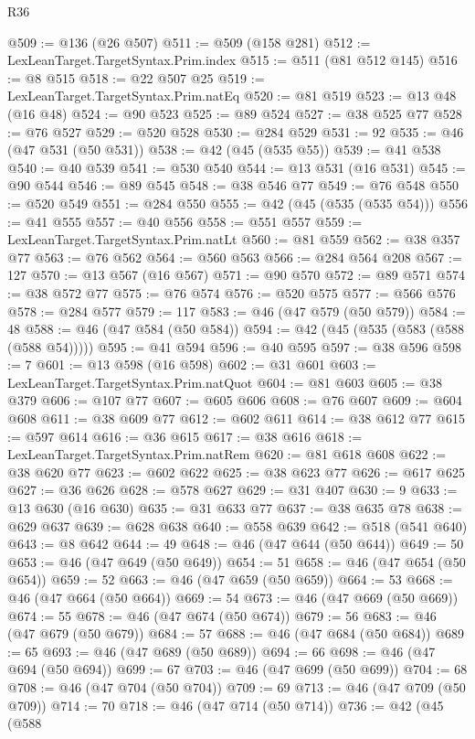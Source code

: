 \begin{lexlean}{R36}
\begin{coremodule}
@509 := @136 (@26 @507)
@511 := @509 (@158 @281)
@512 := LexLeanTarget.TargetSyntax.Prim.index
@515 := @511 (@81 @512 @145)
@516 := @8 @515
@518 := @22 @507 @25
@519 := LexLeanTarget.TargetSyntax.Prim.natEq
@520 := @81 @519
@523 := @13 @48 (@16 @48)
@524 := @90 @523
@525 := @89 @524
@527 := @38 @525 @77
@528 := @76 @527
@529 := @520 @528
@530 := @284 @529
@531 := 92
@535 := @46 (@47 @531 (@50 @531))
@538 := @42 (@45 (@535 @55))
@539 := @41 @538
@540 := @40 @539
@541 := @530 @540
@544 := @13 @531 (@16 @531)
@545 := @90 @544
@546 := @89 @545
@548 := @38 @546 @77
@549 := @76 @548
@550 := @520 @549
@551 := @284 @550
@555 := @42 (@45 (@535 (@535 @54)))
@556 := @41 @555
@557 := @40 @556
@558 := @551 @557
@559 := LexLeanTarget.TargetSyntax.Prim.natLt
@560 := @81 @559
@562 := @38 @357 @77
@563 := @76 @562
@564 := @560 @563
@566 := @284 @564 @208
@567 := 127
@570 := @13 @567 (@16 @567)
@571 := @90 @570
@572 := @89 @571
@574 := @38 @572 @77
@575 := @76 @574
@576 := @520 @575
@577 := @566 @576
@578 := @284 @577
@579 := 117
@583 := @46 (@47 @579 (@50 @579))
@584 := 48
@588 := @46 (@47 @584 (@50 @584))
@594 := @42 (@45 (@535 (@583 (@588 (@588 @54)))))
@595 := @41 @594
@596 := @40 @595
@597 := @38 @596
@598 := 7
@601 := @13 @598 (@16 @598)
@602 := @31 @601
@603 := LexLeanTarget.TargetSyntax.Prim.natQuot
@604 := @81 @603
@605 := @38 @379
@606 := @107 @77
@607 := @605 @606
@608 := @76 @607
@609 := @604 @608
@611 := @38 @609 @77
@612 := @602 @611
@614 := @38 @612 @77
@615 := @597 @614
@616 := @36 @615
@617 := @38 @616
@618 := LexLeanTarget.TargetSyntax.Prim.natRem
@620 := @81 @618 @608
@622 := @38 @620 @77
@623 := @602 @622
@625 := @38 @623 @77
@626 := @617 @625
@627 := @36 @626
@628 := @578 @627
@629 := @31 @407
@630 := 9
@633 := @13 @630 (@16 @630)
@635 := @31 @633 @77
@637 := @38 @635 @78
@638 := @629 @637
@639 := @628 @638
@640 := @558 @639
@642 := @518 (@541 @640)
@643 := @8 @642
@644 := 49
@648 := @46 (@47 @644 (@50 @644))
@649 := 50
@653 := @46 (@47 @649 (@50 @649))
@654 := 51
@658 := @46 (@47 @654 (@50 @654))
@659 := 52
@663 := @46 (@47 @659 (@50 @659))
@664 := 53
@668 := @46 (@47 @664 (@50 @664))
@669 := 54
@673 := @46 (@47 @669 (@50 @669))
@674 := 55
@678 := @46 (@47 @674 (@50 @674))
@679 := 56
@683 := @46 (@47 @679 (@50 @679))
@684 := 57
@688 := @46 (@47 @684 (@50 @684))
@689 := 65
@693 := @46 (@47 @689 (@50 @689))
@694 := 66
@698 := @46 (@47 @694 (@50 @694))
@699 := 67
@703 := @46 (@47 @699 (@50 @699))
@704 := 68
@708 := @46 (@47 @704 (@50 @704))
@709 := 69
@713 := @46 (@47 @709 (@50 @709))
@714 := 70
@718 := @46 (@47 @714 (@50 @714))
@736 := @42
    (@45
      (@588

\end{coremodule}
\end{lexlean}
